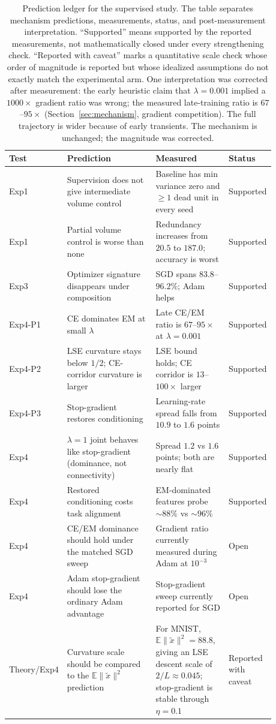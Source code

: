 \begin{table}[h]
\centering
\begin{tabular}{p{0.11\linewidth}p{0.36\linewidth}p{0.28\linewidth}p{0.13\linewidth}}
\toprule
Test & Prediction & Measured & Status \\
\midrule
Exp1 & Supervision does not give intermediate volume control &
Baseline has min variance zero and $\ge 1$ dead unit in every seed & Supported \\
Exp1 & Partial volume control is worse than none &
Redundancy increases from $20.5$ to $187.0$; accuracy is worst & Supported \\
Exp3 & Optimizer signature disappears under composition &
SGD spans $83.8$--$96.2\%$; Adam helps & Supported \\
Exp4-P1 & CE dominates EM at small $\lambda$ &
Late CE/EM ratio is $67$--$95\times$ at $\lambda=0.001$ & Supported \\
Exp4-P2 & LSE curvature stays below $1/2$; CE-corridor curvature is larger &
LSE bound holds; CE corridor is $13$--$100\times$ larger & Supported \\
Exp4-P3 & Stop-gradient restores conditioning &
Learning-rate spread falls from $10.9$ to $1.6$ points & Supported \\
Exp4 & $\lambda=1$ joint behaves like stop-gradient (dominance, not connectivity) &
Spread $1.2$ vs $1.6$ points; both are nearly flat & Supported \\
Exp4 & Restored conditioning costs task alignment &
EM-dominated features probe $\sim 88\%$ vs $\sim 96\%$ & Supported \\
Exp4 & CE/EM dominance should hold under the matched SGD sweep &
Gradient ratio currently measured during Adam at $10^{-3}$ & Open \\
Exp4 & Adam stop-gradient should lose the ordinary Adam advantage &
Stop-gradient sweep currently reported for SGD & Open \\
Theory/Exp4 & Curvature scale should be compared to the
$\mathbb{E}\|\tilde{x}\|^2$ prediction &
For MNIST, $\mathbb{E}\|\tilde{x}\|^2=88.8$, giving an LSE descent scale of
$2/L\approx0.045$; stop-gradient is stable through $\eta=0.1$ & Reported with
caveat \\
\bottomrule
\end{tabular}
\caption{Prediction ledger for the supervised study. The table separates
mechanism predictions, measurements, status, and post-measurement
interpretation. ``Supported'' means supported by the reported measurements,
not mathematically closed under every strengthening check. ``Reported with
caveat'' marks a quantitative scale check whose order of magnitude is reported
but whose idealized assumptions do not exactly match the experimental arm. One
interpretation was corrected after measurement: the early heuristic claim that
$\lambda=0.001$ implied a $1000\times$ gradient ratio was wrong; the measured
late-training ratio is $67$--$95\times$ (Section~\ref{sec:mechanism}, gradient
competition). The full trajectory is wider because of early transients. The
mechanism is unchanged; the magnitude was corrected.}
\label{tab:predictions-ledger}
\end{table}

